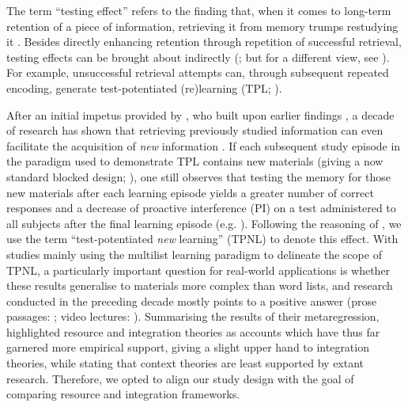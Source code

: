 \documentclass[../main.tex]{subfiles}
\begin{document}
The term ``testing effect'' refers to the finding that, when it comes to 
long-term retention of a piece of information, retrieving it from memory 
trumps restudying it 
\citep{karpickeCriticalImportanceRetrieval2008,roedigeriiiPowerTestingMemory2006,
 roedigeriiiTestEnhancedLearningTaking2006, rowlandEffectTestingRestudy2014, 
adesopeRethinkingUseTests2017, roedigeriiiCriticalRoleRetrieval2011, 
gloverTestingPhenomenonNot1989}. Besides directly enhancing retention 
through repetition of successful retrieval, testing effects can be brought 
about indirectly (\citealp{arnoldTestpotentiatedLearningDistinguishing2013, 
roedigeriiiPowerTestingMemory2006}; but for a different view, see 
\citealp{kornellRetrievalAttemptsEnhance2015}). For example, unsuccessful 
retrieval attempts can, through subsequent repeated encoding, generate 
test-potentiated (re)learning (TPL;
\citealp{izawaReinforcementTestSequencesPairedAssociate1966,izawaOptimalPotentiatingEffects1970,
 kornellUnsuccessfulRetrievalAttempts2009, arnoldFreeRecallEnhances2013, 
arnoldTestpotentiatedLearningDistinguishing2013, 
wissmanTestpotentiatedLearningThree2018}).

After an initial impetus provided by 
\cite{szpunarTestingStudyInsulates2008}, who built upon earlier findings 
\citep{darleyEffectsPriorFree1971, tulvingNegativeTransferEffects1974}, a 
decade of research has shown that retrieving previously studied information 
can even facilitate the acquisition of \textit{new} information 
\citep{chanRetrievalPotentiatesNew2018, 
pastotterRetrievalPracticeEnhances2014, yangEnhancingLearningRetrieval2018}. 
If each subsequent study episode in the paradigm used to demonstrate TPL 
contains new materials (giving a now standard blocked design; 
\citealp{chanTestingPotentiatesNew2018}), one still observes that testing 
the memory for those new materials after each learning episode yields a 
greater number of correct responses and a decrease of proactive interference 
(PI) on a test administered to all subjects after the final learning episode 
(e.g. \citealp{szpunarInterpolatedMemoryTests2013, 
szpunarTestingStudyInsulates2008, wissmanInterimTestEffect2011}). Following 
the reasoning of \cite{chanRetrievalPotentiatesNew2018}, we use the term 
``test-potentiated \textit{new} learning'' (TPNL) to denote this effect.
With studies mainly using the multilist learning paradigm to delineate the 
scope of TPNL, a particularly important question for real-world applications 
is whether these results generalise to materials more complex than word 
lists, and research conducted in the preceding decade mostly points to a 
positive answer (prose passages: \citealp{wissmanInterimTestEffect2011, 
divisRetrievalSpeedsContext2014}; video lectures: 
\citealp{szpunarInterpolatedMemoryTests2013, 
jingInterpolatedTestingInfluences2016}). Summarising the results of their 
metaregression, \cite{chanRetrievalPotentiatesNew2018} highlighted resource 
and integration theories as accounts which have thus far garnered more 
empirical support, giving a slight upper hand to integration theories, while 
stating that context theories are least supported by extant research. 
Therefore, we opted to align our study design with the goal of comparing 
resource and integration frameworks.
\end{document}
